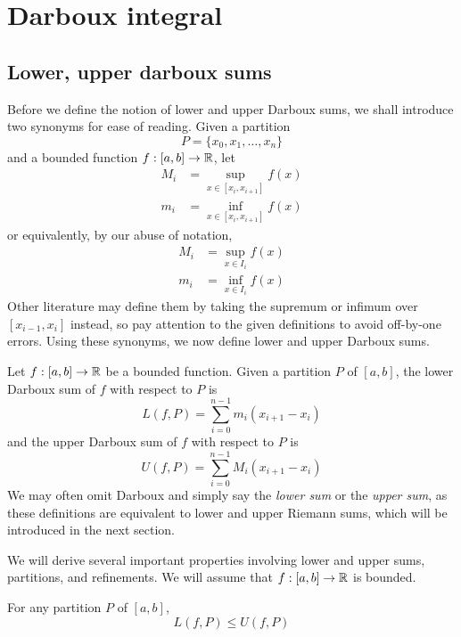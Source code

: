 
\section{Darboux integral}


\subsection{Lower, upper darboux sums}
Before we define the notion of lower and upper Darboux sums, we shall introduce two synonyms for ease of reading. Given a partition
\[
  P = \{x_0, x_1, \ldots, x_n\}
\]
and a bounded function $f: [a, b] \to \mathbb{R}$, let
\begin{align*}
  M_i &= \sup_{x \in [x_i, x_{i + 1}]} f(x) \\ 
  m_i &= \inf_{x \in [x_i, x_{i + 1}]} f(x)
\end{align*}
or equivalently, by our abuse of notation,
\begin{align*}
  M_i &= \sup_{x \in I_i} f(x) \\ 
  m_i &= \inf_{x \in I_i} f(x)
\end{align*}
Other literature may define them by taking the supremum or infimum over $[x_{i - 1}, x_i]$ instead, so pay attention to the given definitions to avoid off-by-one errors. Using these synonyms, we now define lower and upper Darboux sums.
\begin{definition}
  Let $f: [a, b] \to \mathbb{R}$ be a bounded function. Given a partition $P$ of $[a, b]$, the lower Darboux sum of $f$ with respect to $P$ is
  \[
    L(f, P) = \sum_{i = 0}^{n - 1} m_i (x_{i + 1} - x_i)
  \]
  and the upper Darboux sum of $f$ with respect to $P$ is
  \[
    U(f, P) = \sum_{i = 0}^{n - 1} M_i (x_{i + 1} - x_i)
  \]
  We may often omit Darboux and simply say the \textit{lower sum} or the \textit{upper sum}, as these definitions are equivalent to lower and upper Riemann sums, which will be introduced in the next section.
\end{definition}
We will derive several important properties involving lower and upper sums, partitions, and refinements. We will assume that $f: [a, b] \to \mathbb{R}$ is bounded.
\begin{prop}
  \label{prop:lower-upper-sum-trivial}
  For any partition $P$ of $[a, b]$,
  \[
    L(f, P) \leq U(f, P)
  \]
\end{prop}
